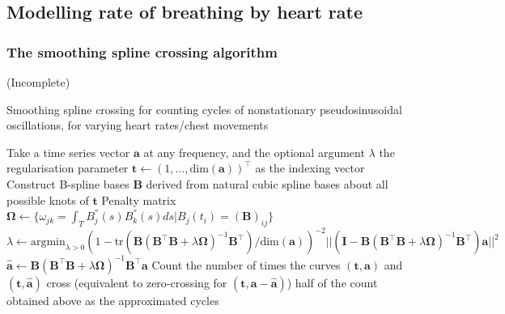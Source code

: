 \documentclass[
]{article}
\begin{document}
\hypertarget{modelling-rate-of-breathing-by-heart-rate}{%
\subsection{Modelling rate of breathing by heart
rate}\label{modelling-rate-of-breathing-by-heart-rate}}

\hypertarget{the-smoothing-spline-crossing-algorithm}{%
\subsubsection{The smoothing spline crossing
algorithm}\label{the-smoothing-spline-crossing-algorithm}}

(Incomplete)

\begin{algorithm}
\caption{Smoothing spline crossing for counting cycles of nonstationary pseudosinusoidal oscillations, for varying heart rates/chest movements}
\begin{algorithmic}[1]
\STATE Take a time series vector $\mathbf{a}$ at any frequency, and the optional argument $\lambda$ the regularisation parameter
\STATE $\mathbf{t} \leftarrow (1, ..., \text{dim}(\mathbf{a}))^\top$ as the indexing vector
\STATE Construct B-spline bases $\mathbf{B}$ derived from natural cubic spline bases about all possible knots of $\mathbf{t}$
\STATE Penalty matrix $\boldsymbol{\Omega} \leftarrow \{\omega_{jk} = \int_T {B_j^{''}(s)B_k^{''}(s)}ds | B_j(t_i) = (\mathbf{B})_{ij}\}$
\STATE $\lambda \leftarrow \text{argmin}_{\lambda > 0} (1 - \text{tr}(\mathbf{B}(\mathbf{B}^\top\mathbf{B} + \lambda\boldsymbol{\Omega})^{-1}\mathbf{B}^\top) / \text{dim}(\mathbf{a}))^{-2}||(\mathbf{I} - \mathbf{B}(\mathbf{B}^\top\mathbf{B} + \lambda\boldsymbol{\Omega})^{-1}\mathbf{B}^\top)\mathbf{a}||^2$
\ENDIF
\STATE $\mathbf{\hat{a}} \leftarrow \mathbf{B}(\mathbf{B}^\top\mathbf{B} + \lambda\boldsymbol{\Omega})^{-1}\mathbf{B}^\top\mathbf{a}$
\STATE Count the number of times the curves $(\mathbf{t}, \mathbf{a})$ and $(\mathbf{t}, \mathbf{\hat{a}})$ cross (equivalent to zero-crossing for $(\mathbf{t}, \mathbf{a} - \mathbf{\hat{a}})$)
\RETURN half of the count obtained above as the approximated cycles
\end{algorithmic}
\end{algorithm}
\end{document}
